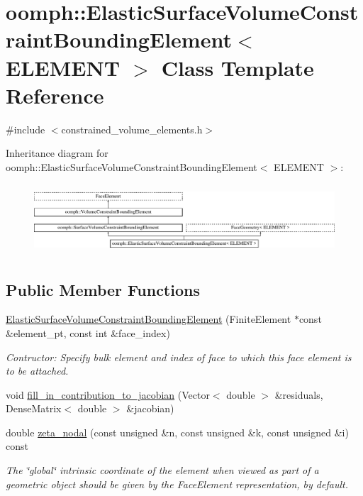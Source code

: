 \hypertarget{classoomph_1_1ElasticSurfaceVolumeConstraintBoundingElement}{}\section{oomph\+:\+:Elastic\+Surface\+Volume\+Constraint\+Bounding\+Element$<$ E\+L\+E\+M\+E\+NT $>$ Class Template Reference}
\label{classoomph_1_1ElasticSurfaceVolumeConstraintBoundingElement}


{\ttfamily \#include $<$constrained\+\_\+volume\+\_\+elements.\+h$>$}

Inheritance diagram for oomph\+:\+:Elastic\+Surface\+Volume\+Constraint\+Bounding\+Element$<$ E\+L\+E\+M\+E\+NT $>$\+:\begin{figure}[H]
\begin{center}
\leavevmode
\includegraphics[height=2.647754cm]{classoomph_1_1ElasticSurfaceVolumeConstraintBoundingElement}
\end{center}
\end{figure}
\subsection*{Public Member Functions}
\begin{DoxyCompactItemize}
\item 
\hyperlink{classoomph_1_1ElasticSurfaceVolumeConstraintBoundingElement_a22e5cb7f3cb0d363301ae8ef232dd6cb}{Elastic\+Surface\+Volume\+Constraint\+Bounding\+Element} (Finite\+Element $\ast$const \&element\+\_\+pt, const int \&face\+\_\+index)
\begin{DoxyCompactList}\small\item\em Contructor\+: Specify bulk element and index of face to which this face element is to be attached. \end{DoxyCompactList}\item 
void \hyperlink{classoomph_1_1ElasticSurfaceVolumeConstraintBoundingElement_a16addc228d9871f22cd9eaf9b581ff5c}{fill\+\_\+in\+\_\+contribution\+\_\+to\+\_\+jacobian} (Vector$<$ double $>$ \&residuals, Dense\+Matrix$<$ double $>$ \&jacobian)
\item 
double \hyperlink{classoomph_1_1ElasticSurfaceVolumeConstraintBoundingElement_ab9826b68e1931ed4eafdf20af0bf070d}{zeta\+\_\+nodal} (const unsigned \&n, const unsigned \&k, const unsigned \&i) const
\begin{DoxyCompactList}\small\item\em The \char`\"{}global\char`\"{} intrinsic coordinate of the element when viewed as part of a geometric object should be given by the Face\+Element representation, by default. \end{DoxyCompactList}\end{DoxyCompactItemize}
